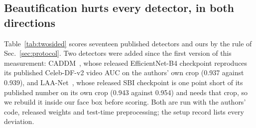 %

\subsection{Beautification hurts every detector, in both directions}
\label{sec:measure}
Table~\ref{tab:twosided} scores seventeen published detectors and ours by the rule of Sec.~\ref{sec:protocol}. Two
detectors were added since the first version of this measurement: CADDM~\cite{caddm}, whose released EfficientNet-B4
checkpoint reproduces its published Celeb-DF-v2 video AUC on the authors' own crop (0.937 against 0.939), and
LAA-Net~\cite{laanet}, whose released SBI checkpoint is one point short of its published number on its own crop (0.943
against 0.954) and needs that crop, so we rebuild it inside our face box before scoring. Both are run with the authors'
code, released weights and test-time preprocessing; the setup record lists every deviation.

